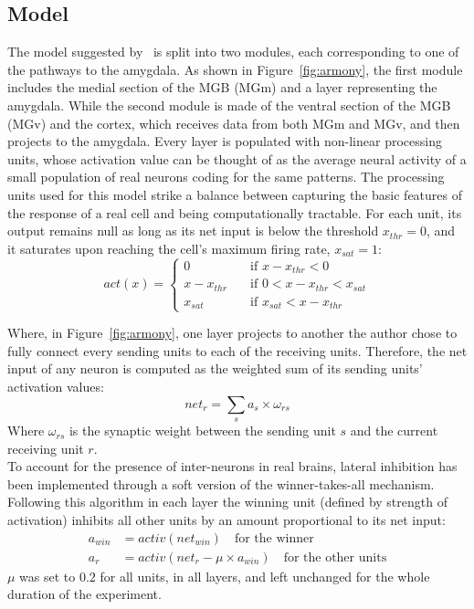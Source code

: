 \subsection{Model}
The model suggested by~\citet{Armony1995} is split into two modules, each corresponding to one of the pathways to the amygdala. As shown in Figure~\ref{fig:armony}, the first module includes the medial section of the MGB (MGm) and a layer representing the amygdala. While the second module is made of the ventral section of the MGB (MGv) and the cortex, which receives data from both MGm and MGv, and then projects to the amygdala. Every layer is populated with non-linear processing units, whose activation value can be thought of as the average neural activity of a small population of real neurons coding for the same patterns. The processing units used for this model strike a balance between capturing the basic features of the response of a real cell and being computationally tractable. For each unit, its output remains null as long as its net input is below the threshold $x_{thr} = 0$, and it saturates upon reaching the cell's maximum firing rate, $x_{sat} = 1$:
\begin{equation}
   act(x) = 
   \begin{cases}
      0 & \quad \text{if } x - x_{thr} < 0 \\
      x - x_{thr} & \quad \text{if } 0 < x - x_{thr} < x_{sat} \\
      x_{sat} & \quad \text{if } x_{sat} < x - x_{thr}
   \end{cases}
\end{equation}

Where, in Figure~\ref{fig:armony}, one layer projects to another the author chose to fully connect every sending units to each of the receiving units. Therefore, the net input of any neuron is computed as the weighted sum of its sending units' activation values:
\begin{equation}
   net_{r} = \sum_{s} a_{s} \times \omega_{rs}
\end{equation}
Where $\omega_{rs}$ is the synaptic weight between the sending unit $s$ and the current receiving unit $r$.\\

To account for the presence of inter-neurons in real brains, lateral inhibition has been implemented through a soft version of the winner-takes-all mechanism. Following this algorithm in each layer the winning unit (defined by strength of activation) inhibits all other units by an amount proportional to its net input: 
\begin{equation}
\begin{split}
   a_{win} &= activ(net_{win}) \quad \text{for the winner}\\ 
   a_{r} &= activ(net_{r} - \mu \times a_{win}) \quad \text{for the other units}
\end{split}
\end{equation}
$\mu$ was set to $0.2$ for all units, in all layers, and left unchanged for the whole duration of the experiment.\\

